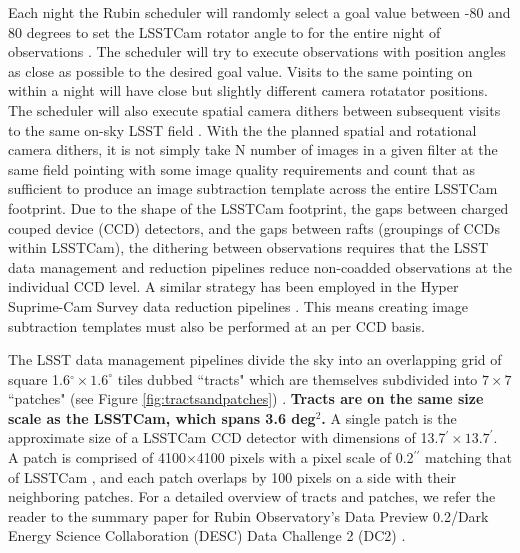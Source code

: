 \documentclass[preprint,linenumbers]{aastex631}
\begin{document}
	Each night the Rubin scheduler will randomly select a goal value between -80 and 80 degrees to set the LSSTCam rotator angle to for the entire night of observations \citep{v3.4sims}. The scheduler will try to execute observations with position angles as close as possible to the desired goal value. Visits to the same pointing on within a night will have close but slightly different camera rotatator positions. The scheduler will also execute spatial camera dithers between subsequent visits to the same on-sky LSST field \citep{v3.4sims}. With the the planned spatial and rotational camera dithers, it is not simply take N number of images in a given filter at the same field pointing with some image quality requirements and count that as sufficient to produce an image subtraction template across the entire LSSTCam footprint. Due to the shape of the LSSTCam footprint, the gaps between charged couped device (CCD) detectors, and the gaps between rafts (groupings of CCDs within LSSTCam), the dithering between observations requires that the LSST data management and reduction pipelines reduce non-coadded observations at the individual CCD level. A similar strategy has been employed in the Hyper Suprime-Cam Survey data reduction pipelines \citep{2018PASJ...70S...5B}. This means creating image subtraction templates must also be performed at an per CCD basis. 
	
	The LSST data management pipelines divide the sky into an overlapping grid of square 1.6$^{\circ} \times 1.6^{\circ}$ tiles dubbed ``tracts" which are themselves subdivided into $7 \times 7$ ``patches" (see Figure \ref{fig:tractsandpatches}) \citep{2018PASJ...70S...5B, LDM-151}. 
	\textbf{Tracts are on the same size scale as the LSSTCam, which spans 3.6 deg$^2$.} %
	A single patch is the approximate size of a LSSTCam CCD detector with dimensions of 13.7$^{\prime} \times 13.7^{\prime}$. A patch is comprised of 4100$\times$4100 pixels with a pixel scale of 0.2$^{\prime\prime}$ matching that of LSSTCam \citep{2019ApJ...873..111I,LDM-151}, and each patch overlaps by 100 pixels on a side with their neighboring patches.  For a detailed overview of tracts and patches, we refer the reader to the summary paper for Rubin Observatory's Data Preview 0.2/Dark Energy Science Collaboration (DESC) Data Challenge 2 (DC2) \citep{2021ApJS..253...31L}.  
	
\end{document}

